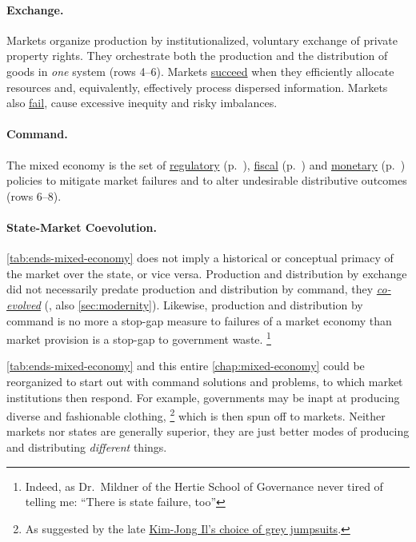 \paragraph[Exchange]{Exchange.}  \label{sec:exchange}
Markets organize production by institutionalized, voluntary exchange of private property rights.
They orchestrate both the production and the distribution of goods in \emph{one} system (rows 4--6).
Markets \hyperref[sec:market-solutions-production]{succeed} when they efficiently allocate resources and, equivalently, effectively process dispersed information.
Markets also \hyperref[sec:market-failures]{fail}, cause excessive inequity and risky imbalances.

\paragraph[Command]{Command.}  \label{sec:command}
The mixed economy is the set of \hyperref[sec:regulatory]{regulatory} (p.~\pageref{sec:regulatory}), \hyperref[sec:fiscal]{fiscal} (p.~\pageref{sec:fiscal}) and \hyperref[sec:monetary]{monetary} (p.~\pageref{sec:monetary}) policies to mitigate market failures and to alter undesirable distributive outcomes (rows 6--8).

\paragraph{State-Market Coevolution.} \autoref{tab:ends-mixed-economy} does not imply a historical or conceptual primacy of the market over the state, or vice versa.
Production and distribution by exchange did not necessarily predate production and distribution by command, they \hyperref[sec:modernity]{\emph{co-evolved}} (\citealt{Tilly-1985-aa}, also \autoref{sec:modernity}).
Likewise, production and distribution by command is no more a stop-gap measure to failures of a market economy than market provision is a stop-gap to government waste.
\footnote{
	Indeed, as Dr.~Mildner of the Hertie School of Governance never tired of telling me:
	``There is state failure, too''
}

\autoref{tab:ends-mixed-economy} and this entire \autoref{chap:mixed-economy} could be reorganized to start out with command solutions and problems, to which market institutions then respond.
For example, governments may be inapt at producing diverse and fashionable clothing,
\footnote{
	As suggested by the late \href{http://kimjongillookingatthings.tumblr.com/}{Kim-Jong Il's choice of grey jumpsuits}.
}
which is then spun off to markets.
Neither markets nor states are generally superior, they are just better modes of producing and distributing \emph{different} things.

